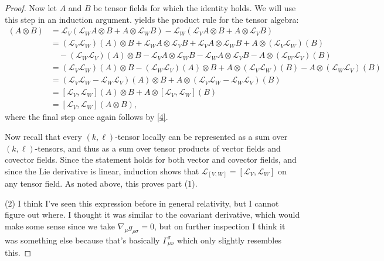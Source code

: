 \documentclass[11pt, letterpaper]{article}
\begin{document}
\begin{proof}
    Now let $A$ and $B$ be tensor fields for which the identity holds. We will use this step in an induction argument.  yields the product rule for the tensor algebra:
    \begin{align*}
        [\mathcal{L}_V, \mathcal{L}_W](A \otimes B) &= \mathcal{L}_V(\mathcal{L}_W A \otimes B + A \otimes \mathcal{L}_W B) - \mathcal{L}_W(\mathcal{L}_V A \otimes B + A \otimes \mathcal{L}_V B) \\
        &= (\mathcal{L}_V\mathcal{L}_W )(A) \otimes B + \mathcal{L}_W A \otimes \mathcal{L}_V B + \mathcal{L}_V A \otimes \mathcal{L}_W B + A \otimes (\mathcal{L}_V\mathcal{L}_W )(B) \\
        &\quad - (\mathcal{L}_W\mathcal{L}_V)( A) \otimes B - \mathcal{L}_V A \otimes \mathcal{L}_W B - \mathcal{L}_W A \otimes \mathcal{L}_V B - A \otimes (\mathcal{L}_W\mathcal{L}_V )(B)\\
	&=(\mathcal{L} _V \mathcal{L} _W)(A)\otimes B-(\mathcal{L} _W\mathcal{L} _V)(A)\otimes B + A\otimes (\mathcal{L} _V\mathcal{L} _W)(B)-A\otimes (\mathcal{L} _W\mathcal{L} _V)(B)\\
	&=(\mathcal{L} _V\mathcal{L} _W - \mathcal{L} _W \mathcal{L} _V)(A)\otimes B + A\otimes (\mathcal{L} _V\mathcal{L} _W - \mathcal{L} _W\mathcal{L} _V)(B)\\
	&=[\mathcal{L} _V,\mathcal{L}_W](A)\otimes B + A\otimes [\mathcal{L} _V,\mathcal{L} _W](B)\\
	&=[\mathcal{L} _V,\mathcal{L} _W](A\otimes B),
    \end{align*}
    where the final step once again follows by \cref{4}.

    Now recall that every $(k,\ell )$-tensor locally can be represented as a sum over $(k,\ell )$-tensors, and thus as a sum over tensor products of vector fields and covector fields. Since the statement holds for both vector and covector fields, and since the Lie derivative is linear, induction shows that $\mathcal{L} _{[V,W]} =[\mathcal{L} _V,\mathcal{L} _W]$ on any tensor field. As noted above, this proves part (1).

    (2) I think I've seen this expression before in general relativity, but I cannot figure out where. I thought it was similar to the covariant derivative, which would make some sense since we take $\nabla _\mu g_{\rho \sigma } =0$, but on further inspection I think it was something else because that's basically $\Gamma _{\mu \nu } ^\sigma $ which only slightly resembles this.


\end{proof}
\end{document}
